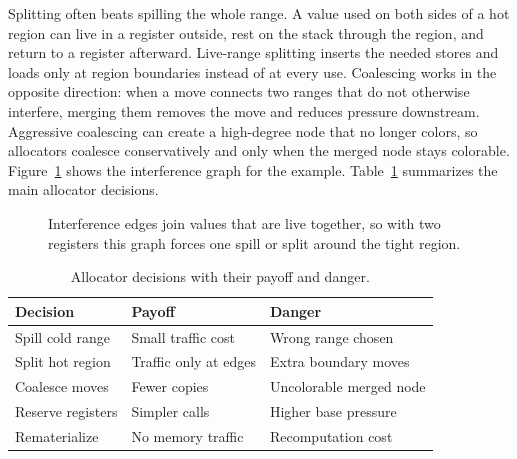 Splitting often beats spilling the whole range.
A value used on both sides of a hot region can live in a register outside, rest on the stack through the region, and return to a register afterward.
Live-range splitting inserts the needed stores and loads only at region boundaries instead of at every use.
Coalescing works in the opposite direction: when a move connects two ranges that do not otherwise interfere, merging them removes the move and reduces pressure downstream.
Aggressive coalescing can create a high-degree node that no longer colors, so allocators coalesce conservatively and only when the merged node stays colorable.
Figure~\ref{fig:ch27-interference} shows the interference graph for the example.
Table~\ref{tab:ch27-alloc-choices} summarizes the main allocator decisions.

\begin{figure}[htbp]
\centering
{}
\caption{Interference edges join values that are live together, so with two registers this graph forces one spill or split around the tight region.}
\label{fig:ch27-interference}
\end{figure}

\begin{table}[htbp]
\caption{Allocator decisions with their payoff and danger.}
\label{tab:ch27-alloc-choices}
\begin{tabular}{lll}
\toprule
Decision & Payoff & Danger \\
\midrule
Spill cold range & Small traffic cost & Wrong range chosen \\
Split hot region & Traffic only at edges & Extra boundary moves \\
Coalesce moves & Fewer copies & Uncolorable merged node \\
Reserve registers & Simpler calls & Higher base pressure \\
Rematerialize & No memory traffic & Recomputation cost \\
\bottomrule
\end{tabular}
\end{table}

